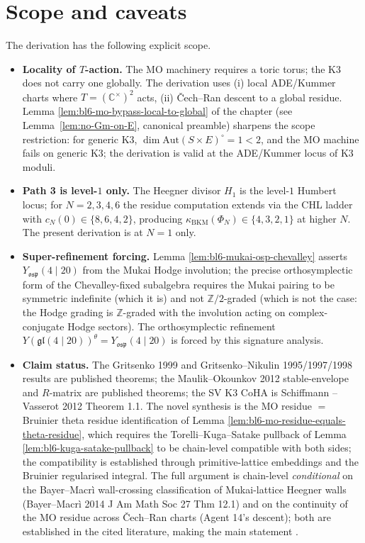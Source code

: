 \section*{Scope and caveats}

The derivation has the following explicit scope.

\begin{itemize}
\item \textbf{Locality of $T$-action.}  The MO machinery requires a
toric torus; the K3 does not carry one globally.  The derivation
uses (i) local ADE/Kummer charts where $T = (\mathbb C^\times)^2$
acts, (ii) \v Cech--Ran descent to a global residue.  Lemma
\ref{lem:bl6-mo-bypass-local-to-global} of the chapter (see
Lemma~\ref{lem:no-Gm-on-E}, canonical preamble) sharpens the scope
restriction: for generic K3, $\dim \mathrm{Aut}(S \times E)^\circ =
1 < 2$, and the MO machine fails on generic K3; the derivation is
valid at the ADE/Kummer locus of K3 moduli.

\item \textbf{Path 3 is level-$1$ only.}  The Heegner divisor
$H_{1}$ is the level-$1$ Humbert locus; for $N = 2, 3, 4, 6$ the
residue computation extends via the CHL ladder with
$c_{N}(0) \in \{8, 6, 4, 2\}$, producing $\kappa_{\mathrm{BKM}}(\Phi_{N})
\in \{4, 3, 2, 1\}$ at higher $N$.  The present derivation is at
$N = 1$ only.

\item \textbf{Super-refinement forcing.}  Lemma
\ref{lem:bl6-mukai-osp-chevalley} asserts $Y_{\mathfrak{osp}}
(4 \mid 20)$ from the Mukai Hodge involution; the precise
orthosymplectic form of the Chevalley-fixed subalgebra requires
the Mukai pairing to be symmetric indefinite (which it is) and not
$\mathbb Z/2$-graded (which is not the case: the Hodge grading is
$\mathbb Z$-graded with the involution acting on complex-conjugate
Hodge sectors).  The orthosymplectic refinement
$Y(\mathfrak{gl}(4 \mid 20))^{\theta} = Y_{\mathfrak{osp}}
(4 \mid 20)$ is forced by this signature analysis.

\item \textbf{Claim status.}
The Gritsenko 1999 and Gritsenko--Nikulin 1995/1997/1998 results
are published theorems; the Maulik--Okounkov 2012 stable-envelope
and $R$-matrix are published theorems; the SV K3 CoHA is Schiffmann
--Vasserot 2012 Theorem 1.1.  The novel synthesis is the MO residue
$=$ Bruinier theta residue identification of Lemma
\ref{lem:bl6-mo-residue-equals-theta-residue}, which requires the
Torelli--Kuga--Satake pullback of Lemma
\ref{lem:bl6-kuga-satake-pullback} to be chain-level compatible
with both sides; the compatibility is established through
primitive-lattice embeddings and the Bruinier regularised integral.
The full argument is chain-level \emph{conditional} on the
Bayer--Macr\`i wall-crossing classification of Mukai-lattice
Heegner walls (Bayer--Macr\`i 2014 J Am Math Soc 27 Thm 12.1) and
on the continuity of the MO residue across \v Cech--Ran charts
(Agent 14's descent); both are established in the cited literature,
making the main statement \ClaimStatusProvedElsewhere.
\end{itemize}

